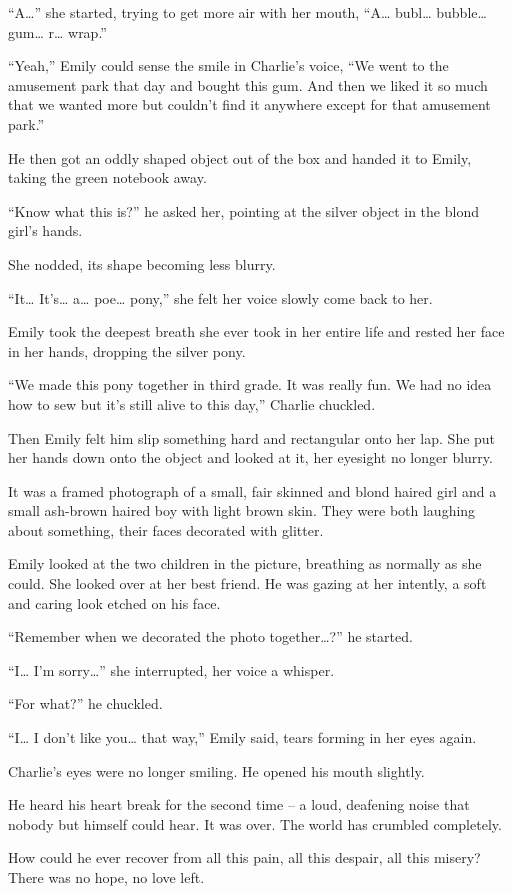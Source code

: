 “A…” she started, trying to get more air with her mouth, “A… bubl… bubble… gum… r… wrap.”

“Yeah,” Emily could sense the smile in Charlie's voice, “We went to the amusement park that day and bought this gum. And then we liked it so much that we wanted more but couldn't find it anywhere except for that amusement park.”

He then got an oddly shaped object out of the box and handed it to Emily, taking the green notebook away.

“Know what this is?” he asked her, pointing at the silver object in the blond girl's hands.

She nodded, its shape becoming less blurry.

“It… It's… a… poe… pony,” she felt her voice slowly come back to her.

Emily took the deepest breath she ever took in her entire life and rested her face in her hands, dropping the silver pony.

“We made this pony together in third grade. It was really fun. We had no idea how to sew but it's still alive to this day,” Charlie chuckled.

Then Emily felt him slip something hard and rectangular onto her lap. She put her hands down onto the object and looked at it, her eyesight no longer blurry.

It was a framed photograph of a small, fair skinned and blond haired girl and a small ash-brown haired boy with light brown skin. They were both laughing about something, their faces decorated with glitter.

Emily looked at the two children in the picture, breathing as normally as she could. She looked over at her best friend. He was gazing at her intently, a soft and caring look etched on his face.

“Remember when we decorated the photo together…?” he started.

“I… I'm sorry…” she interrupted, her voice a whisper.

“For what?” he chuckled.

“I… I don't like you… that way,” Emily said, tears forming in her eyes again.

Charlie's eyes were no longer smiling. He opened his mouth slightly.

He heard his heart break for the second time – a loud, deafening noise that nobody but himself could hear. It was over. The world has crumbled completely.

How could he ever recover from all this pain, all this despair, all this misery? There was no hope, no love left.

